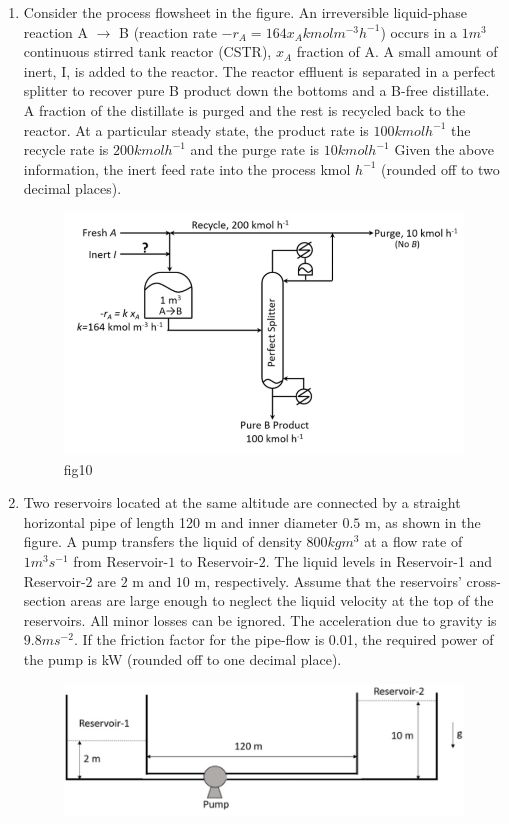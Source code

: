 \documentclass[journal]{IEEEtran}
\numberwithin{equation}{enumi}
\numberwithin{figure}{enumi}
\begin{document}
\begin{enumerate}[start=1, label={Q\arabic*.}]
\item Consider the process flowsheet in the figure. An irreversible liquid-phase reaction A $\rightarrow$ B (reaction rate $-r_A =164 x_A kmol m^{- 3}h^{- 1} $) occurs in a $1m^3$ continuous stirred tank reactor (CSTR), $x_A$ fraction of A. A small amount of inert, I, is added to the reactor. The reactor effluent is separated in a perfect splitter to recover pure B product down the bottoms and a B-free distillate. A fraction of the distillate is purged and the rest is recycled back to the reactor. At a particular steady state, the product rate is $100 kmol h^{-1}$ the recycle rate is $200 kmol h^{-1}$ and the purge rate is $10 kmol h^{-1}$ Given the above information, the inert feed rate into the process \underline{\hspace{1.5cm}} kmol $h^{-1}$ (rounded off to two decimal places).
\begin{figure}[H]
    \centering
    \includegraphics[width=0.5\linewidth]{figs/fig10.jpeg}
    \caption{fig10}
    \label{fig:10}
\end{figure}
\newpage
\item Two reservoirs located at the same altitude are connected by a straight horizontal pipe of length 120 m and inner diameter $0.5$ m, as shown in the figure. A pump transfers the liquid of density $800 kg m^3$ at a flow rate of $1 m^3 s^{-1}$ from Reservoir-$1$ to Reservoir-$2$. The liquid levels in Reservoir-1 and Reservoir-$2$ are $2$ m and $10$ m, respectively. Assume that the reservoirs' cross-section areas are large enough to neglect the liquid velocity at the top of the reservoirs. All minor losses can be ignored. The acceleration due to gravity is $9.8 m s^{-2} $. If the friction factor for the pipe-flow is 0.01, the required power of the pump is \underline{\hspace{1.5cm}} kW (rounded off to one decimal place).
\begin{figure}[H]
    \centering
    \includegraphics[width=0.6\linewidth]{figs/fig11.jpeg}

\end{figure}
\end{enumerate}
\end{document}
